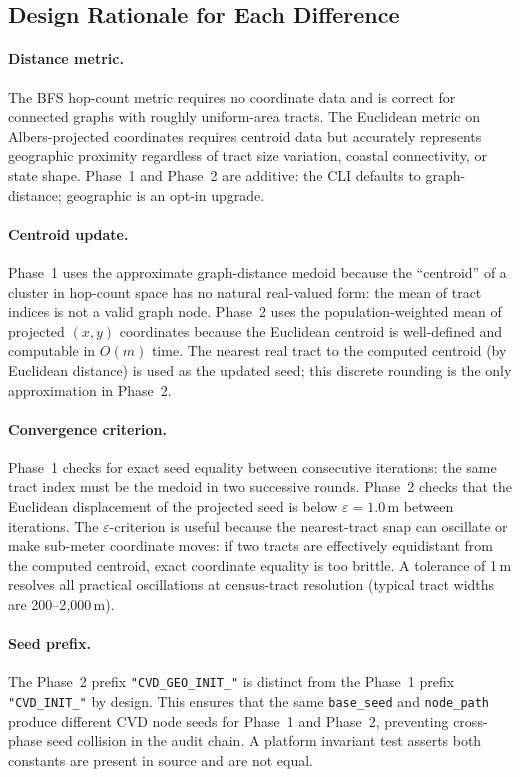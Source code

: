 \subsection{Design Rationale for Each Difference}

\paragraph{Distance metric.}
The BFS hop-count metric requires no coordinate data and is correct for
connected graphs with roughly uniform-area tracts.
The Euclidean metric on Albers-projected coordinates requires centroid data
but accurately represents geographic proximity regardless of tract size
variation, coastal connectivity, or state shape.
Phase~1 and Phase~2 are additive: the CLI defaults to graph-distance;
geographic is an opt-in upgrade.

\paragraph{Centroid update.}
Phase~1 uses the approximate graph-distance medoid because the ``centroid'' of
a cluster in hop-count space has no natural real-valued form: the mean of
tract indices is not a valid graph node.
Phase~2 uses the population-weighted mean of projected $(x, y)$ coordinates
because the Euclidean centroid is well-defined and computable in $O(m)$ time.
The nearest real tract to the computed centroid (by Euclidean distance) is
used as the updated seed; this discrete rounding is the only approximation
in Phase~2.

\paragraph{Convergence criterion.}
Phase~1 checks for exact seed equality between consecutive iterations: the
same tract index must be the medoid in two successive rounds.
Phase~2 checks that the Euclidean displacement of the projected seed is
below $\varepsilon = 1.0$\,m between iterations.
The $\varepsilon$-criterion is useful because the nearest-tract snap can
oscillate or make sub-meter coordinate moves: if two tracts are effectively
equidistant from the computed centroid, exact coordinate equality is too brittle.
A tolerance of 1\,m resolves all practical oscillations at census-tract
resolution (typical tract widths are 200--2{,}000\,m).

\paragraph{Seed prefix.}
The Phase~2 prefix \texttt{"CVD\_GEO\_INIT\_"} is distinct from the Phase~1
prefix \texttt{"CVD\_INIT\_"} by design.
This ensures that the same \texttt{base\_seed} and \texttt{node\_path}
produce different CVD node seeds for Phase~1 and Phase~2, preventing
cross-phase seed collision in the audit chain.
A platform invariant test asserts both constants are present in source
and are not equal.

